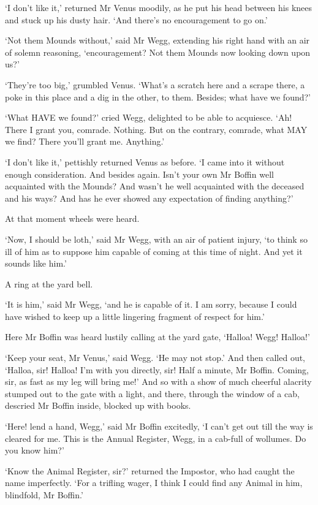 ‘I don’t like it,’ returned Mr Venus moodily, as he put his head between
his knees and stuck up his dusty hair. ‘And there’s no encouragement to
go on.’

‘Not them Mounds without,’ said Mr Wegg, extending his right hand with
an air of solemn reasoning, ‘encouragement? Not them Mounds now looking
down upon us?’

‘They’re too big,’ grumbled Venus. ‘What’s a scratch here and a scrape
there, a poke in this place and a dig in the other, to them. Besides;
what have we found?’

‘What HAVE we found?’ cried Wegg, delighted to be able to acquiesce.
‘Ah! There I grant you, comrade. Nothing. But on the contrary, comrade,
what MAY we find? There you’ll grant me. Anything.’

‘I don’t like it,’ pettishly returned Venus as before. ‘I came into
it without enough consideration. And besides again. Isn’t your own Mr
Boffin well acquainted with the Mounds? And wasn’t he well acquainted
with the deceased and his ways? And has he ever showed any expectation
of finding anything?’

At that moment wheels were heard.

‘Now, I should be loth,’ said Mr Wegg, with an air of patient injury,
‘to think so ill of him as to suppose him capable of coming at this time
of night. And yet it sounds like him.’

A ring at the yard bell.

‘It is him,’ said Mr Wegg, ‘and he is capable of it. I am sorry, because
I could have wished to keep up a little lingering fragment of respect
for him.’

Here Mr Boffin was heard lustily calling at the yard gate, ‘Halloa!
Wegg! Halloa!’

‘Keep your seat, Mr Venus,’ said Wegg. ‘He may not stop.’ And then
called out, ‘Halloa, sir! Halloa! I’m with you directly, sir! Half a
minute, Mr Boffin. Coming, sir, as fast as my leg will bring me!’ And
so with a show of much cheerful alacrity stumped out to the gate with
a light, and there, through the window of a cab, descried Mr Boffin
inside, blocked up with books.

‘Here! lend a hand, Wegg,’ said Mr Boffin excitedly, ‘I can’t get out
till the way is cleared for me. This is the Annual Register, Wegg, in a
cab-full of wollumes. Do you know him?’

‘Know the Animal Register, sir?’ returned the Impostor, who had caught
the name imperfectly. ‘For a trifling wager, I think I could find any
Animal in him, blindfold, Mr Boffin.’

